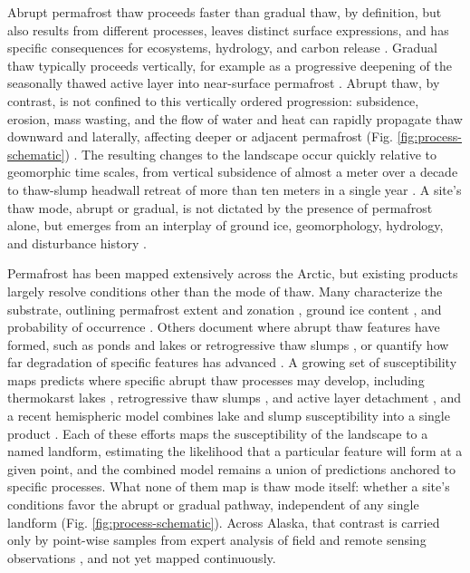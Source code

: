 \documentclass[../main.tex]{subfiles}
\begin{document}
Abrupt permafrost thaw proceeds faster than gradual thaw, by definition, but also results from different processes, leaves distinct surface expressions, and has specific consequences for ecosystems, hydrology, and carbon release \citep{webb2025review}. Gradual thaw typically proceeds vertically, for example as a progressive deepening of the seasonally thawed active layer into near-surface permafrost \citep{walter201821st, webb2025review}. Abrupt thaw, by contrast, is not confined to this vertically ordered progression: subsidence, erosion, mass wasting, and the flow of water and heat can rapidly propagate thaw downward and laterally, affecting deeper or adjacent permafrost (Fig. \ref{fig:process-schematic}) \citep{turetsky2020carbon, nitzbon2020fast, webb2025review}. The resulting changes to the landscape occur quickly relative to geomorphic time scales, from vertical subsidence of almost a meter over a decade \citep{farquharson2019climate} to thaw-slump headwall retreat of more than ten meters in a single year \citep{kokelj2015increased}. A site's thaw mode, abrupt or gradual, is not dictated by the presence of permafrost alone, but emerges from an interplay of ground ice, geomorphology, hydrology, and disturbance history \citep{jorgenson2005response, kokelj2013advances}.

Permafrost has been mapped extensively across the Arctic, but existing products largely resolve conditions other than the mode of thaw. Many characterize the substrate, outlining permafrost extent and zonation \citep{brown1997circum}, ground ice content \citep{jorgenson2008permafrost}, and probability of occurrence \citep{obu2019northern}. Others document where abrupt thaw features have formed, such as ponds and lakes \citep{muster2017perl} or retrogressive thaw slumps \citep{nitze2025darts}, or quantify how far degradation of specific features has advanced \citep{zhang2025mapping}. A growing set of susceptibility maps predicts where specific abrupt thaw processes may develop, including thermokarst lakes \citep{wang2023thermokarst}, retrogressive thaw slumps \citep{makopoulou2024retrogressive}, and active layer detachment \citep{makopoulou2025susceptibility}, and a recent hemispheric model combines lake and slump susceptibility into a single product \citep{yang2025future}. Each of these efforts maps the susceptibility of the landscape to a named landform, estimating the likelihood that a particular feature will form at a given point, and the combined model remains a union of predictions anchored to specific processes. What none of them map is thaw mode itself: whether a site's conditions favor the abrupt or gradual pathway, independent of any single landform (Fig. \ref{fig:process-schematic}). Across Alaska, that contrast is carried only by point-wise samples from expert analysis of field and remote sensing observations \citep{webb2026comprehensive}, and not yet mapped continuously.
\end{document}
